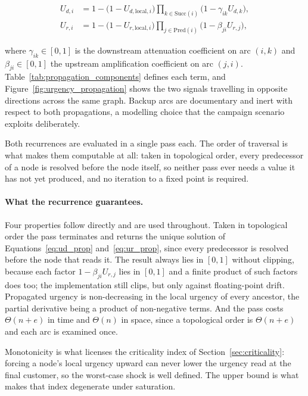 \begin{align}
    U_{d,i} &= 1 - \bigl(1 - U_{d,\text{local},i}\bigr) \prod_{k \in \text{Succ}(i)}
    \bigl(1 - \gamma_{ik} U_{d,k}\bigr), \label{eq:ud_prop} \\
    U_{r,i} &= 1 - \bigl(1 - U_{r,\text{local},i}\bigr) \prod_{j \in \text{Pred}(i)}
    \bigl(1 - \beta_{ji} U_{r,j}\bigr), \label{eq:ur_prop}
\end{align}

where $\gamma_{ik} \in [0,1]$ is the downstream attenuation coefficient on arc $(i,k)$ and
$\beta_{ji} \in [0,1]$ the upstream amplification coefficient on arc $(j,i)$.
Table~\ref{tab:propagation_components} defines each term, and
Figure~\ref{fig:urgency_propagation} shows the two signals travelling in opposite directions
across the same graph. Backup arcs are documentary and inert with respect to both
propagations, a modelling choice that the campaign scenario exploits deliberately.

Both recurrences are evaluated in a single pass each. The order of traversal is what
makes them computable at all: taken in topological order, every predecessor of a node is
resolved before the node itself, so neither pass ever needs a value it has not yet produced,
and no iteration to a fixed point is required.

\paragraph{What the recurrence guarantees.}
\label{prop:propagation}
Four properties follow directly and are used throughout. Taken in topological order the pass
terminates and returns the unique solution of Equations~\ref{eq:ud_prop}
and~\ref{eq:ur_prop}, since every predecessor is resolved before the node that reads it. The
result always lies in $[0,1]$ without clipping, because each factor
$1-\beta_{ji}U_{r,j}$ lies in $[0,1]$ and a finite product of such factors does too; the
implementation still clips, but only against floating-point drift. Propagated urgency is
non-decreasing in the local urgency of every ancestor, the partial derivative being a product
of non-negative terms. And the pass costs $\Theta(n+e)$ in time and $\Theta(n)$ in space,
since a topological order is $\Theta(n+e)$ and each arc is examined once.

Monotonicity is what licenses the criticality index of Section~\ref{sec:criticality}: forcing
a node's local urgency upward can never lower the urgency read at the final customer, so the
worst-case shock is well defined. The upper bound is what makes that index degenerate under
saturation.

